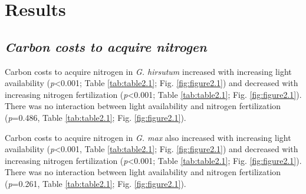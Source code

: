 \section{Results}
\subsection{\textit{Carbon costs to acquire nitrogen}}
\noindent Carbon costs to acquire nitrogen in \textit{G. hirsutum} increased with increasing light availability (\textit{p}<0.001; Table \ref{tab:table2.1}; Fig. \ref{fig:figure2.1}) and decreased with increasing nitrogen fertilization (\textit{p}<0.001; Table \ref{tab:table2.1}; Fig. \ref{fig:figure2.1}). There was no interaction between light availability and nitrogen fertilization (\textit{p}=0.486, Table \ref{tab:table2.1}; Fig. \ref{fig:figure2.1}).

Carbon costs to acquire nitrogen in \textit{G. max} also increased with increasing light availability (\textit{p}<0.001, Table \ref{tab:table2.1}; Fig. \ref{fig:figure2.1}) and decreased with increasing nitrogen fertilization (\textit{p}<0.001; Table \ref{tab:table2.1}; Fig. \ref{fig:figure2.1}). There was no interaction between light availability and nitrogen fertilization (\textit{p}=0.261, Table \ref{tab:table2.1}; Fig. \ref{fig:figure2.1}).

